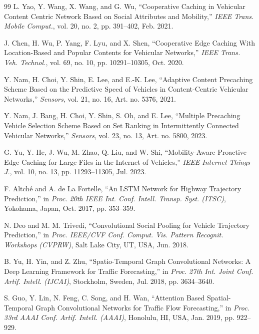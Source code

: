 \documentclass[journal]{IEEEtran}
\begin{document}
\begin{thebibliography}{99}
 L. Yao, Y. Wang, X. Wang, and G. Wu, ``Cooperative Caching in Vehicular Content Centric Network Based on Social Attributes and Mobility,'' \emph{IEEE Trans. Mobile Comput.}, vol. 20, no. 2, pp. 391--402, Feb. 2021.

 J. Chen, H. Wu, P. Yang, F. Lyu, and X. Shen, ``Cooperative Edge Caching With Location-Based and Popular Contents for Vehicular Networks,'' \emph{IEEE Trans. Veh. Technol.}, vol. 69, no. 10, pp. 10291--10305, Oct. 2020.

 Y. Nam, H. Choi, Y. Shin, E. Lee, and E.-K. Lee, ``Adaptive Content Precaching Scheme Based on the Predictive Speed of Vehicles in Content-Centric Vehicular Networks,'' \emph{Sensors}, vol. 21, no. 16, Art. no. 5376, 2021.

 Y. Nam, J. Bang, H. Choi, Y. Shin, S. Oh, and E. Lee, ``Multiple Precaching Vehicle Selection Scheme Based on Set Ranking in Intermittently Connected Vehicular Networks,'' \emph{Sensors}, vol. 23, no. 13, Art. no. 5800, 2023.

 G. Yu, Y. He, J. Wu, M. Zhao, Q. Liu, and W. Shi, ``Mobility-Aware Proactive Edge Caching for Large Files in the Internet of Vehicles,'' \emph{IEEE Internet Things J.}, vol. 10, no. 13, pp. 11293--11305, Jul. 2023.

 F. Altché and A. de La Fortelle, ``An LSTM Network for Highway Trajectory Prediction,'' in \emph{Proc. 20th IEEE Int. Conf. Intell. Transp. Syst. (ITSC)}, Yokohama, Japan, Oct. 2017, pp. 353--359.

 N. Deo and M. M. Trivedi, ``Convolutional Social Pooling for Vehicle Trajectory Prediction,'' in \emph{Proc. IEEE/CVF Conf. Comput. Vis. Pattern Recognit. Workshops (CVPRW)}, Salt Lake City, UT, USA, Jun. 2018.

 B. Yu, H. Yin, and Z. Zhu, ``Spatio-Temporal Graph Convolutional Networks: A Deep Learning Framework for Traffic Forecasting,'' in \emph{Proc. 27th Int. Joint Conf. Artif. Intell. (IJCAI)}, Stockholm, Sweden, Jul. 2018, pp. 3634--3640.

 S. Guo, Y. Lin, N. Feng, C. Song, and H. Wan, ``Attention Based Spatial-Temporal Graph Convolutional Networks for Traffic Flow Forecasting,'' in \emph{Proc. 33rd AAAI Conf. Artif. Intell. (AAAI)}, Honolulu, HI, USA, Jan. 2019, pp. 922--929.


\end{thebibliography}
\end{document}
